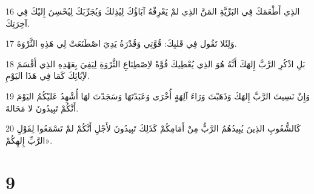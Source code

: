 \par 16 الذِي أَطْعَمَكَ فِي البَرِّيَّةِ المَنَّ الذِي لمْ يَعْرِفْهُ آبَاؤُكَ لِيُذِلكَ وَيُجَرِّبَكَ لِيُحْسِنَ إِليْكَ فِي آخِرَتِكَ.
\par 17 وَلِئَلا تَقُول فِي قَلبِكَ: قُوَّتِي وَقُدْرَةُ يَدِيَ اصْطَنَعَتْ لِي هَذِهِ الثَّرْوَةَ.
\par 18 بَلِ اذْكُرِ الرَّبَّ إِلهَكَ أَنَّهُ هُوَ الذِي يُعْطِيكَ قُوَّةً لاِصْطِنَاعِ الثَّرْوَةِ لِيَفِيَ بِعَهْدِهِ الذِي أَقْسَمَ لآِبَائِكَ كَمَا فِي هَذَا اليَوْمِ.
\par 19 وَإِنْ نَسِيتَ الرَّبَّ إِلهَكَ وَذَهَبْتَ وَرَاءَ آلِهَةٍ أُخْرَى وَعَبَدْتَهَا وَسَجَدْتَ لهَا أُشْهِدُ عَليْكُمُ اليَوْمَ أَنَّكُمْ تَبِيدُونَ لا مَحَالةَ.
\par 20 كَالشُّعُوبِ الذِينَ يُبِيدُهُمُ الرَّبُّ مِنْ أَمَامِكُمْ كَذَلِكَ تَبِيدُونَ لأَجْلِ أَنَّكُمْ لمْ تَسْمَعُوا لِقَوْلِ الرَّبِّ إِلهِكُمْ».

\chapter{9}


